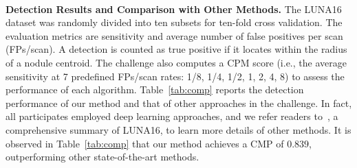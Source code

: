 \documentclass{llncs}
\begin{document}
\begin{table}[t]
\caption{Comparison with different nodule detection methods on LUNA16 dataset~\cite{setio2016validation}.}
\vspace{-2mm}
\centering
{}
\label{tab:comp}
\vspace{-5mm}
\end{table}
\\
\textbf{Detection Results and Comparison with Other Methods.}
The LUNA16 dataset was randomly divided into ten subsets for ten-fold cross validation.
The evaluation metrics are sensitivity and average number of false positives per scan (FPs/scan).
A detection is counted as true positive if it locates within the radius of a nodule centroid.
The challenge also computes a CPM score (i.e., the average sensitivity at 7 predefined FPs/scan rates: 1/8, 1/4, 1/2, 1, 2, 4, 8) to assess the performance of each algorithm.
Table~\ref{tab:comp} reports the detection performance of our method and that of other approaches in the challenge.
In fact, all participates employed deep learning approaches, and we refer readers to~\cite{setio2016validation}, a comprehensive summary of LUNA16, to learn more details of other methods.
It is observed in Table~\ref{tab:comp} that our method achieves a CMP of $0.839$, outperforming other state-of-the-art methods.
\end{document}
